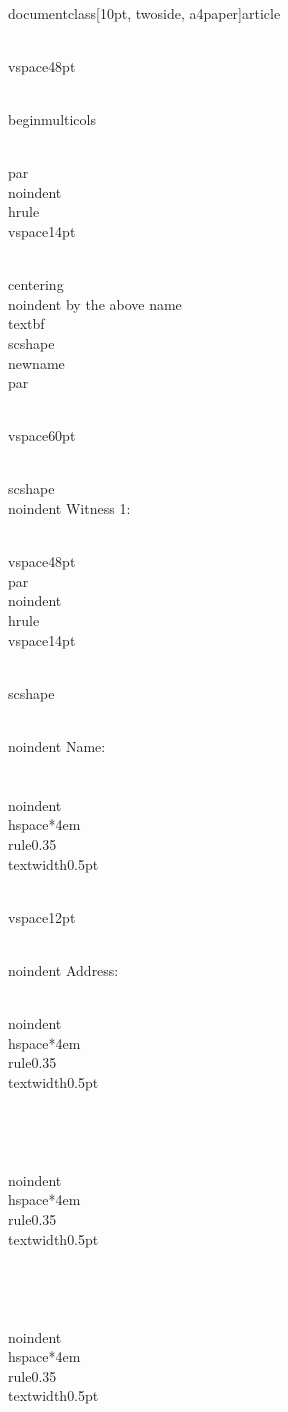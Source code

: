 \\documentclass[10pt, twoside, a4paper]{article}
\begin{document}
\\vspace{48pt}

\\begin{multicols}{2}

	\\par\\noindent\\hrule
	\\vspace{14pt}

	{
		\\centering
		\\noindent
		by the above name \\textbf{\\scshape{\\newname}}
		\\par
	}

	\\vspace{60pt}

	{\\scshape \\noindent Witness 1:}

	\\vspace{48pt}
	\\par\\noindent\\hrule
	\\vspace{14pt}

	{
		\\scshape

		\\noindent Name: \\\\
		\\noindent\\hspace*{4em}\\rule{0.35\\textwidth}{0.5pt}

		\\vspace{12pt}

		\\noindent Address:

		\\noindent\\hspace*{4em}\\rule{0.35\\textwidth}{0.5pt} \\\\ \\\\
		\\noindent\\hspace*{4em}\\rule{0.35\\textwidth}{0.5pt} \\\\ \\\\
		\\noindent\\hspace*{4em}\\rule{0.35\\textwidth}{0.5pt}
	}
\end{document}

